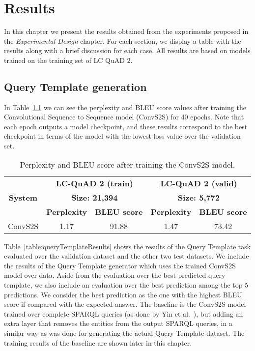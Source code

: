 \chapter{Results}
\label{cap5:results}
In this chapter we present the results obtained from the experiments proposed in the 
\textit{Experimental Design} chapter. For each section, we display a table with the results 
along with a brief discussion for each case. All results are based on models trained on the 
training set of LC QuAD 2.

\section{Query Template generation}
\label{cap5:results/queryTemplate}
In Table~\ref{table:queryTemplateTraining} we can see the perplexity and BLEU score values after 
training the Convolutional Sequence to Sequence model (ConvS2S) for 40 epochs. Note that each 
epoch outputs a model checkpoint, and these results correspond to the best checkpoint in terms 
of the model with the lowest loss value over the validation set.

\begin{table}[h!]
    \centering
    \begin{tabular}{|c|cc|cc|}
        \hline
        \multirow{3}{*}{\textbf{System}} & \multicolumn{2}{c|}{\textbf{LC-QuAD 2 (train)}}       & \multicolumn{2}{c|}{\textbf{LC-QuAD 2 (valid)}}       \\ \cline{2-5} 
                                & \multicolumn{2}{c|}{\textbf{Size: 21,394}}            & \multicolumn{2}{c|}{\textbf{Size: 5,772}}             \\ \cline{2-5} 
                                & \multicolumn{1}{c|}{\textbf{Perplexity}} & \textbf{BLEU score} & \multicolumn{1}{c|}{\textbf{Perplexity}} & \textbf{BLEU score} \\ \hline
        ConvS2S                 & 1.17                            & 91.88      & 1.47                            & 73.42      \\ \hline
    \end{tabular}
    \caption{Perplexity and BLEU score after training the ConvS2S model.}
    \label{table:queryTemplateTraining}
\end{table}

Table~\ref{table:queryTemplateResults} shows the results of the Query Template task evaluated 
over the \LCQuADtwo{} validation dataset and the other two test datasets. We include the results of 
the Query Template generator which uses the trained ConvS2S model over \LCQuADtwo{} data. Aside 
from the evaluation over the best predicted query template, we also include an evaluation over 
the best prediction among the top 5 predictions. We consider the best prediction as the one with 
the highest BLEU score if compared with the expected answer. The baseline is the ConvS2S model 
trained over complete SPARQL queries (as done by Yin et al.~\cite{nmt:nl-to-sparql-Yin19}), but 
adding an extra layer that removes the entities from the output SPARQL queries, in a similar way 
as was done for generating the actual \LCQuADtwo{} Query Template dataset. The training results of 
the baseline are shown later in this chapter.

